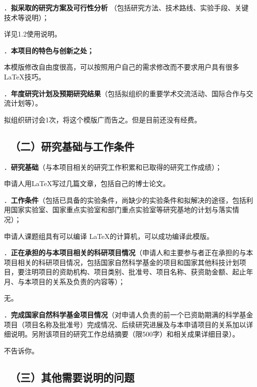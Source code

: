 \documentclass[12pt,UTF8,AutoFakeBold,a4paper]{ctexart} %
\newcommand{\sihao}{\fontsize{14pt}{\baselineskip}\selectfont}
\begin{document}
{\sihao \color{MsBlue} ．{\bfseries 拟采取的研究方案及可行性分析} （包括研究方法、技术路线、实验手段、关键技术等说明）；}

详见1.2使用说明。

{\sihao \color{MsBlue} ．{\bfseries 本项目的特色与创新之处；}}

本模版修改自由度很高，可以按照用户自己的需求修改而不要求用户具有很多\LaTeX 技巧。


{\sihao \color{MsBlue} ．{\bfseries 年度研究计划及预期研究结果}（包括拟组织的重要学术交流活动、国际合作与交流计划等）。}

拟组织研讨会1次，将这个模版广而告之。但是目前还没有经费。

\vskip -5mm %

{\color{MsBlue} \subsection{\sihao \kaishu \quad \ （二）研究基础与工作条件 }}

{\sihao \color{MsBlue} ．{\bfseries 研究基础}（与本项目相关的研究工作积累和已取得的研究工作成绩）；}

申请人用\LaTeX 写过几篇文章，包括自己的博士论文。

{\sihao \color{MsBlue} ．{\bfseries 工作条件}（包括已具备的实验条件，尚缺少的实验条件和拟解决的途径，包括利用国家实验室、国家重点实验室和部门重点实验室等研究基地的计划与落实情况）；}

申请人课题组具有可以编译 \LaTeX 的计算机，可以成功编译此模版。

{\sihao \color{MsBlue} ．{\bfseries 正在承担的与本项目相关的科研项目情况}（申请人和主要参与者正在承担的与本项目相关的科研项目情况，包括国家自然科学基金的项目和国家其他科技计划项目，要注明项目的资助机构、项目类别、批准号、项目名称、获资助金额、起止年月、与本项目的关系及负责的内容等）；}

无。

{\sihao \color{MsBlue} ．{\bfseries 完成国家自然科学基金项目情况}（对申请人负责的前一个已资助期满的科学基金项目（项目名称及批准号）完成情况、后续研究进展及与本申请项目的关系加以详细说明。另附该项目的研究工作总结摘要（限500字）和相关成果详细目录）。}

不告诉你。

{\color{MsBlue} \subsection{\sihao \kaishu \quad \ （三）其他需要说明的问题 }}
\end{document}
